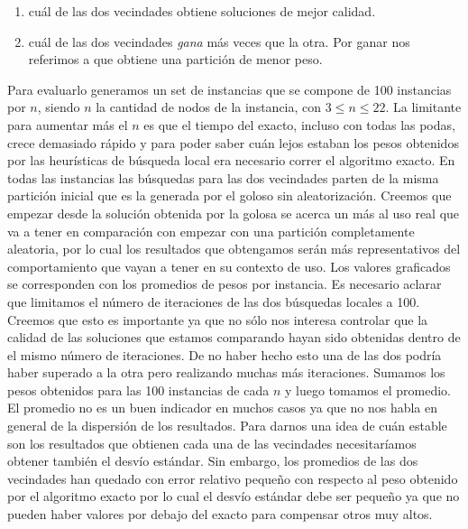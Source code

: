 \begin{enumerate}
  \item cuál de las dos vecindades obtiene soluciones de mejor calidad.
  \item cuál de las dos vecindades \textit{gana} más veces que la otra. 
    Por ganar nos referimos a que obtiene una partición de menor peso.
\end{enumerate}

Para evaluarlo generamos un set de instancias que se compone de 100 instancias por $n$, siendo
$n$ la cantidad de nodos de la instancia, con $3 \leq n \leq 22$. La limitante para aumentar más
el $n$ es que el tiempo del exacto, incluso con todas las podas, crece demasiado rápido y para
poder saber cuán lejos estaban los pesos obtenidos por las heurísticas de búsqueda local era necesario
correr el algoritmo exacto. En todas las instancias las búsquedas para las dos vecindades parten de
la misma partición inicial que es la generada por el goloso sin aleatorización. Creemos que 
empezar desde la solución obtenida por la golosa se acerca un más al uso real que va a tener en 
comparación con empezar con una partición completamente aleatoria, por lo cual los resultados que
obtengamos serán más representativos del comportamiento que vayan a tener en su contexto de uso.
Los valores graficados se corresponden con los promedios de pesos por instancia. Es necesario
aclarar que limitamos el número de iteraciones de las dos búsquedas locales a 100. Creemos
que esto es importante ya que no sólo nos interesa controlar que la calidad de las soluciones que 
estamos comparando hayan sido obtenidas dentro de el mismo número de iteraciones. De no haber hecho esto
una de las dos podría haber superado a la otra pero realizando muchas más iteraciones. Sumamos los pesos
obtenidos para las 100 instancias de cada $n$ y luego tomamos el promedio. El promedio no es un buen 
indicador en muchos casos ya que no nos habla en general de la dispersión de los resultados. Para
darnos una idea de cuán estable son los resultados que obtienen cada una de las vecindades necesitaríamos
obtener también el desvío estándar. Sin embargo, los promedios de las dos vecindades han quedado con error
relativo pequeño con respecto al peso obtenido por el algoritmo exacto por lo cual el desvío estándar debe ser pequeño
ya que no pueden haber valores por debajo del exacto para compensar otros muy altos.

